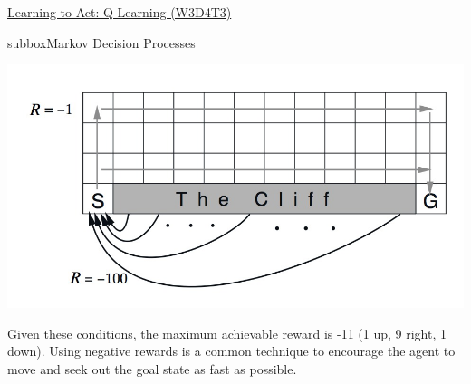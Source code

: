 \begin{textbox}{\href{https://compneuro.neuromatch.io/tutorials/W3D4_ReinforcementLearning/student/W3D4_Tutorial3.html}{Learning to Act: Q-Learning (W3D4T3)} }
\begin{subbox}{subbox}{Markov Decision Processes}
\begin{center}
    
\includegraphics[scale=0.14]{Figures/RL/RL_Figure14.png}
\end{center}

Given these conditions, the maximum achievable reward is -11 (1 up, 9 right, 1 down). Using negative rewards is a common technique to encourage the agent to move and seek out the goal state as fast as possible.

\end{subbox}
\end{textbox}
